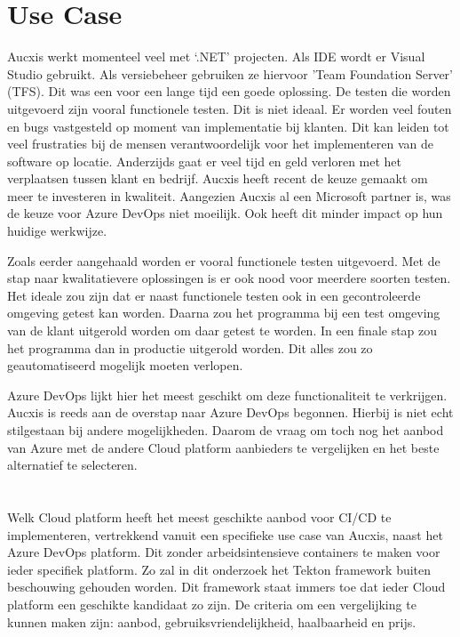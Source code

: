 \section{Use Case}
\label{sec:usecase}
Aucxis werkt momenteel veel met ‘.NET’ projecten. Als IDE wordt er Visual Studio gebruikt. Als versiebeheer gebruiken ze hiervoor 'Team Foundation Server' (TFS). Dit was een voor een lange tijd een goede oplossing. De testen die worden uitgevoerd zijn vooral functionele testen. Dit is niet ideaal. Er worden veel fouten en bugs vastgesteld op moment van implementatie bij klanten. Dit kan leiden tot veel frustraties bij de mensen verantwoordelijk voor het implementeren van de software op locatie. Anderzijds gaat er veel tijd en geld verloren met het verplaatsen tussen klant en bedrijf. Aucxis heeft recent de keuze gemaakt om meer te investeren in kwaliteit. Aangezien Aucxis al een Microsoft partner is, was de keuze voor Azure DevOps niet moeilijk. Ook heeft dit minder impact op hun huidige werkwijze.

Zoals eerder aangehaald worden er vooral functionele testen uitgevoerd. Met de stap naar kwalitatievere oplossingen is er ook nood voor meerdere soorten testen. Het ideale zou zijn dat er naast functionele testen ook in een gecontroleerde omgeving getest kan worden. Daarna zou het programma bij een test omgeving van de klant uitgerold worden om daar getest te worden. In een finale stap zou het programma dan in productie uitgerold worden. Dit alles zou zo geautomatiseerd mogelijk moeten verlopen.

Azure DevOps lijkt hier het meest geschikt om deze functionaliteit te verkrijgen. Aucxis is reeds aan de overstap naar Azure DevOps begonnen. Hierbij is niet echt stilgestaan bij andere mogelijkheden. Daarom de vraag om toch nog het aanbod van Azure met de andere Cloud platform aanbieders te vergelijken en het beste alternatief te selecteren.

\section{}
\label{sec:onderzoeksvraag}
Welk Cloud platform heeft het meest geschikte aanbod voor CI/CD te implementeren, vertrekkend vanuit een specifieke use case van Aucxis, naast het Azure DevOps platform. Dit zonder arbeidsintensieve containers te maken voor ieder specifiek platform. Zo zal in dit onderzoek het Tekton framework buiten beschouwing gehouden worden. Dit framework staat immers toe dat ieder Cloud platform een geschikte kandidaat zo zijn. De criteria om een vergelijking te kunnen maken zijn: aanbod, gebruiksvriendelijkheid, haalbaarheid en prijs.

